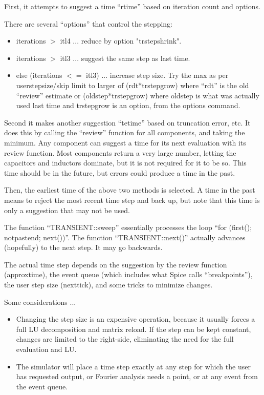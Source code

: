 First, it attempts to suggest a time ``rtime'' based on iteration count
and options.

There are several ``options'' that control the stepping:

\begin{itemize}

\item iterations $>$ itl4 ... reduce by option "trstepshrink".

\item iterations $>$ itl3 ... suggest the same step as last time.

\item else (iterations $<=$ itl3) ... increase step size.  Try the
max as per userstepsize/skip limit to larger of (rdt*trstepgrow) where
``rdt'' is the old ``review'' estimate or (oldstep*trstepgrow) where
oldstep is what was actually used last time and trstepgrow is an
option, from the options command.

\end{itemize}

Second it makes another suggestion ``tetime'' based on truncation
error, etc.  It does this by calling the ``review'' function for all
components, and taking the minimum.  Any component can suggest a time
for its next evaluation with its review function.  Most components
return a very large number, letting the capacitors and inductors
dominate, but it is not required for it to be so.  This time should be
in the future, but errors could produce a time in the past.

Then, the earliest time of the above two methods is selected.  A time
in the past means to reject the most recent time step and back up, but
note that this time is only a suggestion that may not be used.

The function ``TRANSIENT::sweep'' essentially processes the loop ``for
(first(); notpastend; next())''.  The function ``TRANSIENT::next()''
actually advances (hopefully) to the next step.  It may go backwards.

The actual time step depends on the suggestion by the review function
(approxtime), the event queue (which includes what Spice calls
``breakpoints''), the user step size (nexttick), and some tricks to
minimize changes.

Some considerations ...
\begin{itemize}

\item Changing the step size is an expensive operation, because it
usually forces a full LU decomposition and matrix reload.  If the step
can be kept constant, changes are limited to the right-side,
eliminating the need for the full evaluation and LU.

\item The simulator will place a time step exactly at any step for
which the user has requested output, or Fourier analysis needs a
point, or at any event from the event queue.

\end{itemize}

